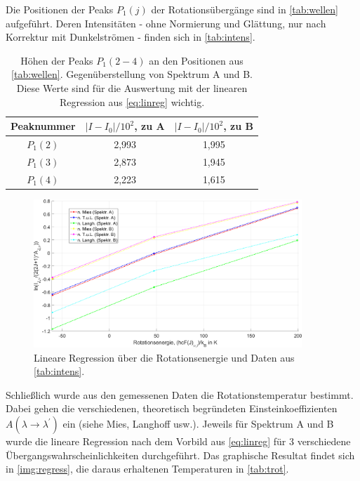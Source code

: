 \documentclass[numbers=noenddot,a4paper,notitlepage,twoside,BCOR15mm]{scrartcl}
\newcommand{\tenpo}[1]{ 10^{#1}}
\newcommand{\ix}[1]{_\text{#1}}
\begin{document}
	Die Positionen der Peaks $P\ix{1}(j)$ der Rotationsübergänge sind in \autoref{tab:wellen} aufgeführt. Deren Intensitäten - ohne Normierung und Glättung, nur nach Korrektur mit Dunkelströmen - finden sich in \autoref{tab:intens}.
	
	\begin{table}[h]
		\centering
		\begin{tabular}{c|c|c}
			Peaknummer & $|I-I\ix{0}|/\tenpo{2}$, zu A & $|I-I\ix{0}|/\tenpo{2}$, zu B\\
			\hline $P\ix{1}(2)$ & 2,993 & 1,995 \\
			\hline $P\ix{1}(3)$ & 2,873 & 1,945 \\
			\hline $P\ix{1}(4)$ & 2,223 & 1,615
		\end{tabular}
		\caption{Höhen der Peaks $P\ix{1}(2-4)$ an den Positionen aus \autoref{tab:wellen}. Gegenüberstellung von Spektrum A und B. Diese Werte sind für die Auswertung mit der linearen Regression aus \autoref{eq:linreg} wichtig.}
		\label{tab:intens}
	\end{table}
	
	\begin{figure}[h]
		\centering
		\includegraphics[width=0.9\textwidth]{linear_reg.png}
		\caption{Lineare Regression über die Rotationsenergie und Daten aus \autoref{tab:intens}.}
		\label{img:regress}
	\end{figure}
	
	Schließlich wurde aus den gemessenen Daten die Rotationstemperatur bestimmt. Dabei gehen die verschiedenen, theoretisch begründeten Einsteinkoeffizienten $A(\lambda\rightarrow\lambda^\prime)$ ein (siehe Mies, Langhoff usw.). Jeweils für Spektrum A und B wurde die lineare Regression nach dem Vorbild aus \autoref{eq:linreg} für 3 verschiedene Übergangswahrscheinlichkeiten durchgeführt. Das graphische Resultat findet sich in \autoref{img:regress}, die daraus erhaltenen Temperaturen in \autoref{tab:trot}.
	
\end{document}
